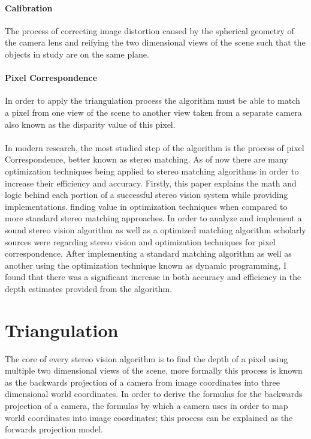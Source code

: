 \documentclass[11pt]{scrartcl}
\begin{document}
    \paragraph{ Calibration} The process of correcting image distortion caused by the
        spherical geometry of the camera lens
        and reifying the two dimensional views of the scene such that
        the objects in study are on the same plane.
  \paragraph{Pixel Correspondence} In order to apply the triangulation process the algorithm must be
        able to match a pixel from one view of the scene to another view taken from a separate camera
        also known as the disparity value of this pixel.
\\

\\

In modern research, the most studied step of the algorithm is the process of pixel Correspondence,
better known as stereo matching. As of now there are many optimization techniques being applied
to stereo matching algorithms in order to increase their efficiency and accuracy. Firstly, this paper explains
the math and logic behind each portion of a successful stereo vision system while providing implementations.  finding value in optimization techniques
when compared to more standard stereo matching approaches. In order to analyze and implement a sound stereo vision algorithm
as well as a optimized matching algorithm scholarly sources were regarding stereo vision and optimization
techniques for pixel correspondence. After implementing a standard matching algorithm as well as another using
the optimization technique known as dynamic programming, I found that there was a significant increase
in both accuracy and efficiency in the depth estimates provided from the algorithm.


\section{Triangulation}

The core of every stereo vision algorithm is to find the depth of a pixel
using multiple two dimensional views of the scene, more formally
this process is known as the backwards projection of a camera from image
coordinates into three dimensional world coordinates. In order to derive the
formulas for the backwards projection of a camera, the formulas by which
a camera uses in order to map world coordinates into image coordinates; this
process can be explained as the forwards projection model.
\end{document}
